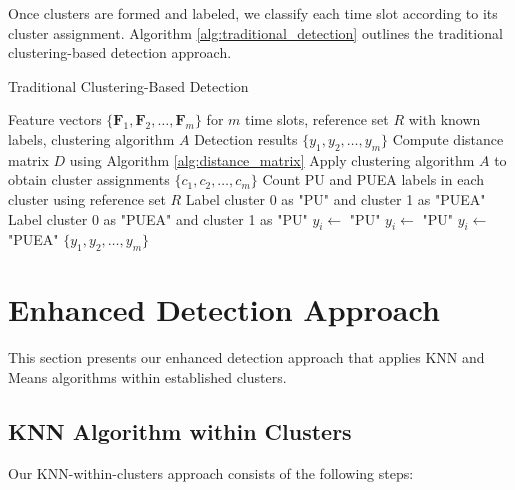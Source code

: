 \documentclass[conference]{IEEEtran}
\begin{document}
Once clusters are formed and labeled, we classify each time slot according to its cluster assignment. Algorithm \ref{alg:traditional_detection} outlines the traditional clustering-based detection approach.

\begin{algorithm}
\caption{Traditional Clustering-Based Detection}
\label{alg:traditional_detection}
\begin{algorithmic}[1]
\REQUIRE Feature vectors $\{\mathbf{F}_1, \mathbf{F}_2, \ldots, \mathbf{F}_m\}$ for $m$ time slots, reference set $R$ with known labels, clustering algorithm $A$
\ENSURE Detection results $\{y_1, y_2, \ldots, y_m\}$
\STATE Compute distance matrix $D$ using Algorithm \ref{alg:distance_matrix}
\STATE Apply clustering algorithm $A$ to obtain cluster assignments $\{c_1, c_2, \ldots, c_m\}$
\STATE Count PU and PUEA labels in each cluster using reference set $R$
    \STATE Label cluster 0 as "PU" and cluster 1 as "PUEA"
\ELSE
    \STATE Label cluster 0 as "PUEA" and cluster 1 as "PU"
\ENDIF
{}
        \STATE $y_i \gets$ "PU"
        \STATE $y_i \gets$ "PU"
    \ELSE
        \STATE $y_i \gets$ "PUEA"
    \ENDIF
\ENDFOR
\RETURN $\{y_1, y_2, \ldots, y_m\}$
\end{algorithmic}
\end{algorithm}

\section{Enhanced Detection Approach}
\label{sec:enhanced_detection}

This section presents our enhanced detection approach that applies KNN and Means algorithms within established clusters.

\subsection{KNN Algorithm within Clusters}

Our KNN-within-clusters approach consists of the following steps:
\end{document}
